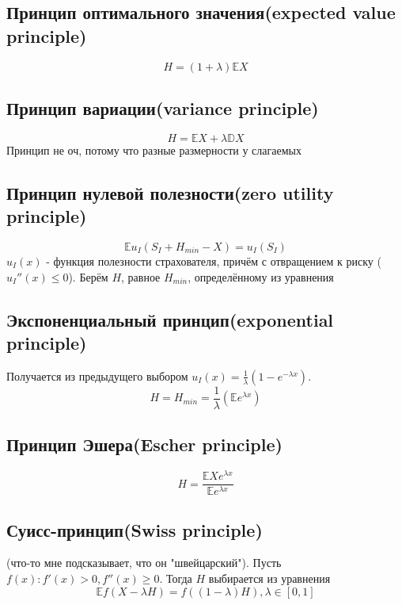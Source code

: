 \documentclass{article}
\theoremstyle{definition}
\begin{document}
\subsection{Принцип оптимального значения(expected value principle)}
$$H = (1 + \lambda)\mathbb{E}X$$
\subsection{Принцип вариации(variance principle)}
$$H = \mathbb{E}X + \lambda\mathbb{D}X$$ Принцип не оч, потому что разные размерности у слагаемых
\subsection{Принцип нулевой полезности(zero utility principle)}
$$\mathbb{E}u_I(S_I + H_{min} - X) = u_I(S_I)$$ $u_I(x)$ - функция полезности страхователя, причём с отвращением к риску ($u_I''(x) \le 0$). Берём $H$, равное $H_{min}$, определённому из уравнения
\subsection{Экспоненциальный принцип(exponential principle)}
Получается из предыдущего выбором $u_I(x) = \frac{1}{\lambda}(1 - e^{-\lambda x})$. $$H = H_{min} = \frac{1}{\lambda}(\mathbb{E}e^{\lambda x})$$
\subsection{Принцип Эшера(Escher principle)} $$H = \frac{\mathbb{E}Xe^{\lambda x}}{\mathbb{E}e^{\lambda x}}$$
\subsection{Суисс-принцип(Swiss principle)} 
(что-то мне подсказывает, что он "швейцарский"). Пусть $f(x) : f'(x) > 0, f''(x) \ge 0$. Тогда $H$ выбирается из уравнения $$\mathbb{E}f(X - \lambda H) = f((1 - \lambda)H), \lambda \in [0, 1]$$
\end{document}
